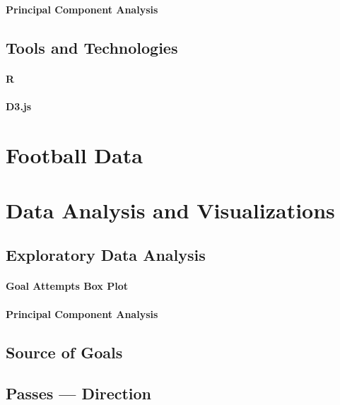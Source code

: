 \documentclass[a4paper,11pt]{article}
\begin{document}
\paragraph{Principal Component Analysis\\}


\subsection{Tools and Technologies} %
\paragraph{R\\} %


\paragraph{D3.js\\} %

\section{Football Data}

\section{Data Analysis and Visualizations}
\subsection{Exploratory Data Analysis}
\paragraph{Goal Attempts Box Plot\\}

\paragraph{Principal Component Analysis\\}

\label{sec:PCA}

\subsection{Source of Goals}


\subsection{Passes --- Direction}

\end{document}
